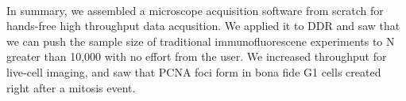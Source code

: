 \paragraph*{} In summary, we assembled a microscope acquisition software from scratch for hands-free high throughput data acqusition. We applied it to DDR and saw that we can push the sample size of traditional immunofluorescene experiments to N greater than 10,000 with no effort from the user. We increased throughput for live-cell imaging, and saw that PCNA foci form in bona fide G1 cells created right after a mitosis event.
